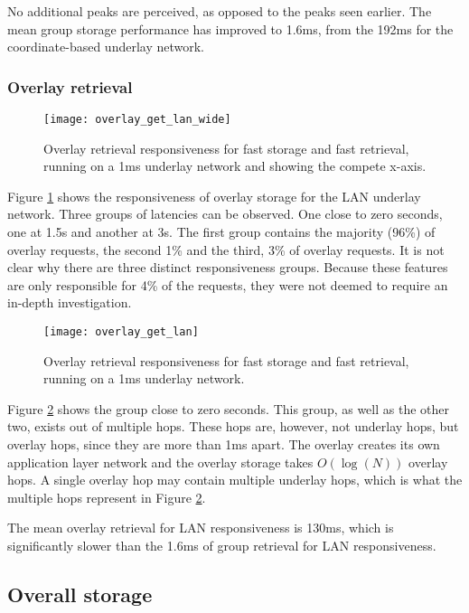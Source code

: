 No additional peaks are perceived, as opposed to the peaks seen earlier. The mean group storage performance has improved to 1.6ms, from the 192ms for the coordinate-based underlay network.

\subsubsection{Overlay retrieval}

\begin{figure}[htbp]
 \centering
 \texttt{[image: overlay\_get\_lan\_wide]}
 \caption{Overlay retrieval responsiveness for fast storage and fast retrieval, running on a 1ms underlay network and showing the compete x-axis.}
 \label{fig_overlay_get_lan_wide}
\end{figure}
%
Figure \ref{fig_overlay_get_lan_wide} shows the responsiveness of overlay storage for the LAN underlay network. Three groups of latencies can be observed. One close to zero seconds, one at 1.5s and another at 3s. The first group contains the majority (96\%) of overlay requests, the second 1\% and the third, 3\% of overlay requests. It is not clear why there are three distinct responsiveness groups. Because these features are only responsible for 4\% of the requests, they were not deemed to require an in-depth investigation.

\begin{figure}[htbp]
 \centering
 \texttt{[image: overlay\_get\_lan]}
 \caption{Overlay retrieval responsiveness for fast storage and fast retrieval, running on a 1ms underlay network.}
 \label{fig_overlay_get_lan}
\end{figure}
%
Figure \ref{fig_overlay_get_lan} shows the group close to zero seconds. This group, as well as the other two, exists out of multiple hops. These hops are, however, not underlay hops, but overlay hops, since they are more than 1ms apart. The overlay creates its own application layer network and the overlay storage takes $O(\log(N))$ overlay hops. A single overlay hop may contain multiple underlay hops, which is what the multiple hops represent in Figure \ref{fig_overlay_get_lan}.

The mean overlay retrieval for LAN responsiveness is 130ms, which is significantly slower than the 1.6ms of group retrieval for LAN responsiveness.

\subsection{Overall storage}

